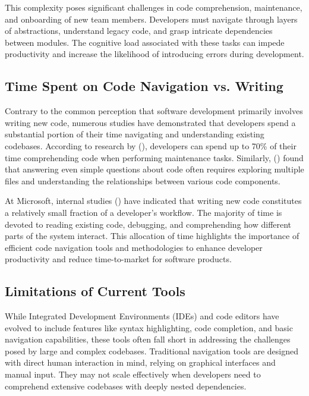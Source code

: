 \documentclass[12pt,oneside]{article}
\begin{document}
This complexity poses significant challenges in code comprehension, maintenance, and onboarding of new team members. Developers must 
navigate through layers of abstractions, understand legacy code, and grasp intricate dependencies between modules. The cognitive load 
associated with these tasks can impede productivity and increase the likelihood of introducing errors during development.

\subsection{Time Spent on Code Navigation vs. Writing}

Contrary to the common perception that software development primarily involves writing new code, numerous studies have
demonstrated that developers spend a substantial portion of their time navigating and understanding existing codebases.
According to research by (\cite{ko2006exploratory}), developers can spend up to 70\% of their time comprehending code
when performing maintenance tasks. Similarly, (\cite{Schroer_2024}) found that answering even simple questions
about code often requires exploring multiple files and understanding the relationships between various code components.

At Microsoft, internal studies (\cite{meyer2021today}) have indicated that writing new code constitutes a relatively small 
fraction of a developer’s workflow. The majority of time is devoted to reading existing code,
debugging, and comprehending how different parts of the system interact. This allocation of time 
highlights the importance of efficient code navigation tools and methodologies to enhance developer
productivity and reduce time-to-market for software products.


\subsection{Limitations of Current Tools}

While Integrated Development Environments (IDEs) and code editors have evolved to include 
features like syntax highlighting, code completion, and basic navigation capabilities, these 
tools often fall short in addressing the challenges posed by large and complex codebases. Traditional
navigation tools are designed with direct human interaction in mind, relying on graphical interfaces and manual input.
They may not scale effectively when developers need to comprehend extensive codebases with deeply nested dependencies.
\end{document}
